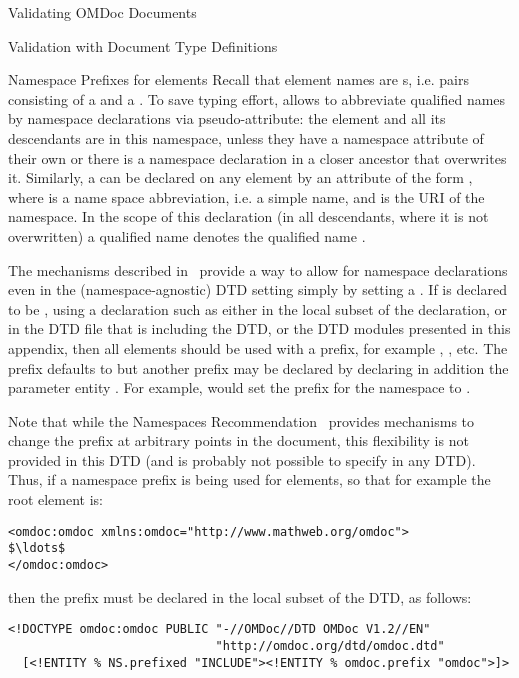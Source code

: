 \begin{tchapter}[id=validating]{Validating OMDoc Documents}
\begin{tsection}[id=validate-dtd]{Validation with Document Type Definitions}
\begin{tsubsection}[id=namespace-magic]{Namespace Prefixes for {\omdoc} elements}
  Recall that element names are  {s}, i.e. pairs
  consisting of a {} and a {}. To save typing
  effort, {\xml} allows to abbreviate qualified names by namespace declarations via
  {} pseudo-attribute: the element and all its descendants are in this
  namespace, unless they have a namespace attribute of their own or there is a namespace
  declaration in a closer ancestor that overwrites it.  Similarly, a
  {} can be declared on any element by an attribute of
  the form {}, where {} is a name space
  abbreviation, i.e. a simple name, and {} is the URI of the namespace.  In
  the scope of this declaration (in all descendants, where it is not overwritten) a
  qualified name {} denotes the qualified name {}.

  The mechanisms described in~\cite{AltBou:mox01} provide a way to allow for namespace
  declarations even in the (namespace-agnostic) DTD setting simply by setting a
  {}. If {} is declared to be
  {}, using a declaration such as {} either in the local subset of the {} declaration, or
  in the DTD file that is including the {\omdoc} DTD, or the DTD modules presented in this
  appendix, then all {\omdoc} elements should be used with a prefix, for example
  {}, {}, etc. The prefix defaults to
  {} but another prefix may be declared by declaring in addition the
  parameter entity {}. For example, {} would set the prefix for the {\omdoc} namespace to
  {}.

Note that while the Namespaces Recommendation~\cite{BraHol:xmlns99} provides
mechanisms to change the prefix at arbitrary points in the document, this
flexibility is not provided in this DTD (and is probably not possible to specify
in any DTD).  Thus, if a namespace prefix is being used for {\omdoc} elements, so
that for example the root element is:
\begin{lstlisting}[index={omdoc:omdoc},mathescape]
<omdoc:omdoc xmlns:omdoc="http://www.mathweb.org/omdoc">
$\ldots$
</omdoc:omdoc>
\end{lstlisting}
then the prefix must be declared in the local subset of the DTD, as follows:
\begin{lstlisting}[index={omdoc:omdoc,DOCTYPE,ENTITY,NS.prefixed,INCLUDE}]
<!DOCTYPE omdoc:omdoc PUBLIC "-//OMDoc//DTD OMDoc V1.2//EN"
                             "http://omdoc.org/dtd/omdoc.dtd"
  [<!ENTITY % NS.prefixed "INCLUDE"><!ENTITY % omdoc.prefix "omdoc">]>
\end{lstlisting}


\end{tsubsection}
\end{tsection}
\end{tchapter}
